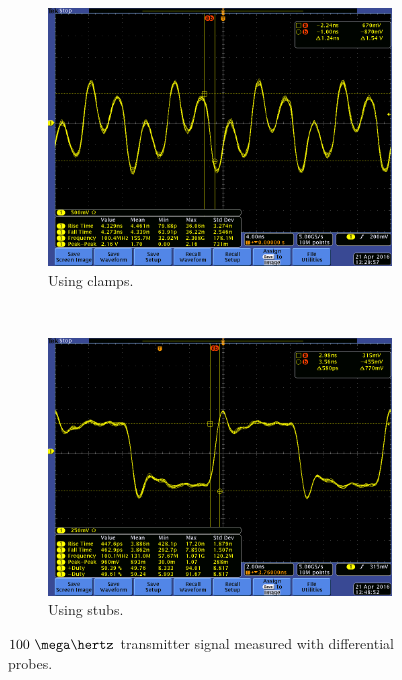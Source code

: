 \documentclass[main.tex]{subfiles}
\begin{document}
\begin{figure}[H]
    \centering
    \begin{subfigure}{0.5\textwidth}
        \centering
        \includegraphics[width=\linewidth]{../img/hektere_oppsett_100mhz.png}
        \caption{Using clamps.}
    \end{subfigure}%
    ~~
    \begin{subfigure}{0.5\textwidth}
        \centering
        \includegraphics[width=\linewidth]{../img/stubs_oppsett_100mhz.png}
        \caption{Using stubs.}
    \end{subfigure}
    \caption{$100~\mega\hertz$ transmitter signal measured with differential probes.}
    \label{fig:measdiff}
\end{figure}
\end{document}

